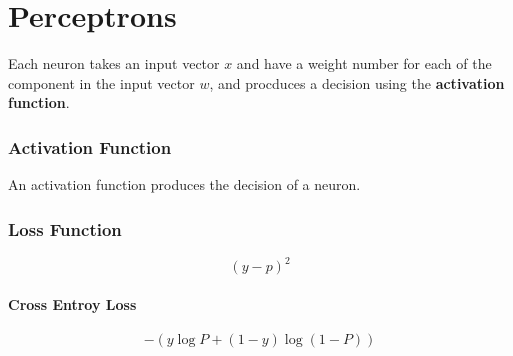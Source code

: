 \section{Perceptrons}

  Each neuron takes an input vector $ x $ and have a weight number for
  each of the component in the input vector $ w $, and procduces a
  decision using the \textbf{activation function}.

  \subsubsection{Activation Function}

    An activation function produces the decision of a neuron.

  \subsubsection{Loss Function}

    \begin{equation}
      \left( y - p \right)^{2}
    \end{equation}

    \paragraph{Cross Entroy Loss}
    \begin{equation}
      -\left( y \log P + \left( 1 - y \right) \log\left( 1 - P \right) \right)
    \end{equation}